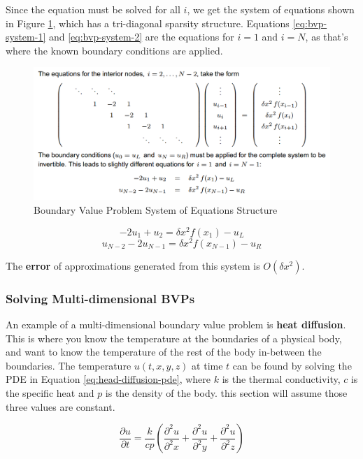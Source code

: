 \documentclass{article}
\begin{document}
Since the equation must be solved for all $i$, we get the system of equations shown in Figure \ref{fig:bvp-system}, which has a tri-diagonal sparsity structure. Equations \ref{eq:bvp-system-1} and \ref{eq:bvp-system-2} are the equations for $i = 1$ and $i = N$, as that's where the known boundary conditions are applied.

\begin{figure}
	\centering
	\includegraphics[scale=0.45]{figures/bvp-system.png}
	\caption{Boundary Value Problem System of Equations Structure}
	\label{fig:bvp-system}
\end{figure}
\begin{equation}
	-2u_1 + u_2 = \delta x^2 f(x_1) - u_L
	\label{eq:bvp-system-1}
\end{equation}
\begin{equation}
	u_{N - 2} - 2u_{N - 1} = \delta x^2 f(x_{N - 1}) - u_R
	\label{eq:bvp-system-2}
\end{equation}

The \textbf{error} of approximations generated from this system is $O(\delta x^2)$.

\subsubsection{Solving Multi-dimensional BVPs}

An example of a multi-dimensional boundary value problem is \textbf{heat diffusion}. This is where you know the temperature at the boundaries of a physical body, and want to know the temperature of the rest of the body in-between the boundaries. The temperature $u(t, x, y, z)$ at time $t$ can be found by solving the PDE in Equation \ref{eq:head-diffusion-pde}, where $k$ is the thermal conductivity, $c$ is the specific heat and $p$ is the density of the body. this section will assume those three values are constant.

\begin{equation}
	\frac{\partial u}{\partial t} = \frac{k}{cp} \left( \frac{\partial^2 u}{\partial^2 x} + \frac{\partial^2 u}{\partial^2 y} + \frac{\partial^2 u}{\partial^2 z}  \right)
	\label{eq:head-diffusion-pde}
\end{equation}
\end{document}
